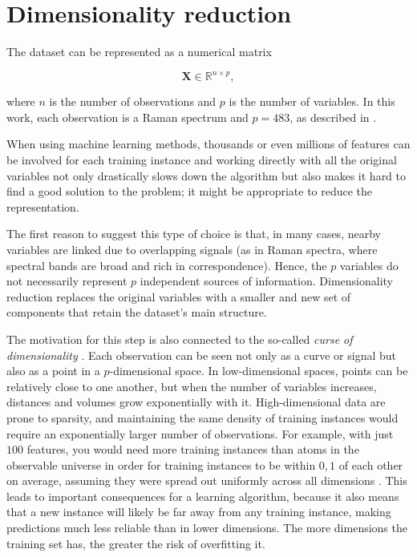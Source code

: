 \section{Dimensionality reduction}
\label{sec:dimensionality_reduction}

The dataset can be represented as a numerical matrix

\begin{equation}
    \mathbf{X} \in \mathbb{R}^{n \times p},
    \label{eq:pca_data_matrix}
\end{equation}

where \(n\) is the number of observations and \(p\) is the number of variables. In this work, each observation is a Raman spectrum and \(p = 483\), as described in .

When using machine learning methods, thousands or even millions of features can be involved for
each training instance and working directly with all the original variables not only drastically slows down the algorithm but also makes it hard to find a good solution to the problem; it might be appropriate to reduce the representation.

The first reason to suggest this type of choice is that, in many cases, nearby variables are linked due to overlapping signals (as in Raman spectra, where spectral bands are broad and rich in correspondence). Hence, the \(p\) variables do not necessarily represent \(p\) independent sources of information. Dimensionality reduction replaces the original variables with a smaller and new set of components that retain the dataset's main structure.

The motivation for this step is also connected to the so-called \textit{curse of dimensionality} \cite{geron2022hands}. Each observation can be seen not only as a curve or signal but also as a point in a \(p\)-dimensional space. 
In low-dimensional spaces, points can be relatively close to one another, but when the number of variables increases, distances and volumes grow exponentially with it. High-dimensional data are prone to sparsity, and maintaining the same density of training instances would require an exponentially larger number of observations. For example, with just \(100\) features, you would need more training instances than atoms in the observable universe in order for training instances to be within \(0{,}1\) of each other on average, assuming they were spread out uniformly across all dimensions \cite{geron2022hands}. 
This leads to important consequences for a learning algorithm, because it also means that a new instance
will likely be far away from any training instance, making predictions much less reliable than in lower dimensions.
The more dimensions the training set has, the greater the risk of overfitting it.

